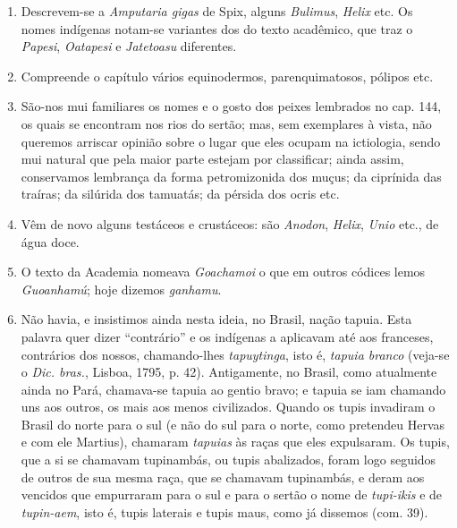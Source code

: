 \begin{enumerate}
\item Descrevem-se a \textit{Amputaria gigas} de Spix, alguns \textit{Bulimus}, \textit{Helix} etc. Os nomes 
indígenas notam-se variantes dos do texto acadêmico, que traz o \textit{Papesi}, \textit{Oatapesi} e 
\textit{Jatetoasu} diferentes.

\item Compreende o capítulo vários equinodermos, parenquimatosos, pólipos etc.

\item São-nos mui familiares os nomes e o gosto dos peixes lembrados no cap. 144, os 
quais se encontram nos rios do sertão; mas, sem exemplares à vista, não queremos 
arriscar opinião sobre o lugar que eles ocupam na ictiologia, sendo mui natural que pela 
maior parte estejam por classificar; ainda assim, conservamos lembrança da forma 
petromizonida dos muçus; da ciprínida das traíras; da silúrida dos tamuatás; da pérsida 
dos ocris etc.

\item Vêm de novo alguns testáceos e crustáceos: são \textit{Anodon}, \textit{Helix}, \textit{Unio} etc., de água 
doce.

\item O texto da Academia nomeava \textit{Goachamoi} o que em outros códices lemos 
\textit{Guoanhamú}; hoje dizemos \textit{ganhamu}.

\item Não havia, e insistimos ainda nesta ideia, no Brasil, nação tapuia. Esta palavra 
quer dizer ``contrário'' e os indígenas a aplicavam até aos franceses, contrários dos 
nossos, chamando-lhes \textit{tapuytinga}, isto é, \textit{tapuia branco} (veja-se o \textit{Dic. bras.}, Lisboa, 
1795, p. 42). Antigamente, no Brasil, como atualmente ainda no Pará, chamava-se 
tapuia ao gentio bravo; e tapuia se iam chamando uns aos outros, os mais aos menos 
civilizados. Quando os tupis invadiram o Brasil do norte para o sul (e não do sul para o 
norte, como pretendeu Hervas e com ele Martius), chamaram \textit{tapuias} às raças que eles 
expulsaram. Os tupis, que a si se chamavam tupinambás, ou tupis abalizados, foram 
logo seguidos de outros de sua mesma raça, que se chamavam tupinambás, e deram aos 
vencidos que empurraram para o sul e para o sertão o nome de \textit{tupi-ikis} e de \textit{tupin-aem}, 
isto é, tupis laterais e tupis maus, como já dissemos (com. 39).


\end{enumerate}
